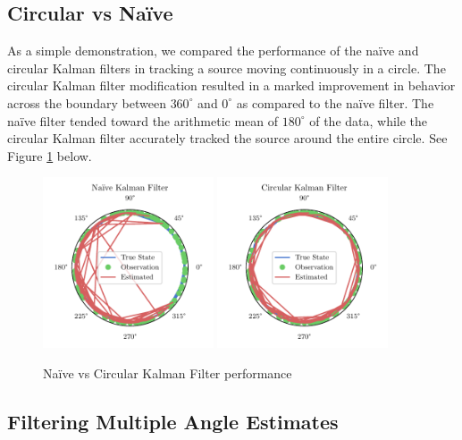 \documentclass[11pt]{amsart}
\begin{document}
\subsection{Circular vs Naïve}
As a simple demonstration, we compared the performance of the naïve and circular Kalman filters in tracking a source moving continuously in a circle. The circular Kalman filter modification resulted in a marked improvement in behavior across the boundary between $360^{\circ}$ and $0^{\circ}$ as 
compared to the naïve filter. The naïve filter tended toward the arithmetic mean of $180^{\circ}$ of the data, while the circular Kalman filter accurately tracked the source around the entire circle. See Figure \ref{fig:simple_kalman} below.


\begin{figure}[htp]
    \centering
    \includegraphics[width=0.45\textwidth]{actual_paper_graphs/non_altered_kalman.pdf}\hfill
    \includegraphics[width=0.45\textwidth]{actual_paper_graphs/altered_kalman.pdf}\hfill
    \caption{Naïve vs Circular Kalman Filter performance}
    \label{fig:simple_kalman}
\end{figure}

\subsection{Filtering Multiple Angle Estimates}
\end{document}
